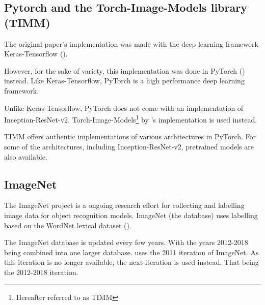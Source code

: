 \documentclass{article}
\begin{document}
    
    \subsection{Pytorch and the Torch-Image-Models library (TIMM)} \label{torch}
        The original paper's implementation was made with the deep learning framework Keras-Tensorflow (\cite{chollet2015keras}).
        
        However, for the sake of variety, this implementation was done in PyTorch (\cite{NEURIPS2019_9015}) instead. Like Keras-Tensorflow, PyTorch is a high performance deep learning framework.
        
        Unlike Keras-Tensorflow, PyTorch does not come with an implementation of Inception-ResNet-v2. Torch-Image-Models\footnote{Hereafter referred to as TIMM} by \cite{rw2019timm}'s implementation is used instead.
        
        TIMM offers authentic implementations of various architectures in PyTorch. For some of the architectures, including Inception-ResNet-v2, pretrained models are also available. 
    
    \subsection{ImageNet} \label{imagenet}
        The ImageNet project is a ongoing research effort for collecting and labelling image data for object recognition models. ImageNet (the database) uses labelling based on the WordNet lexical dataset (\cite{Fellbaum1998}).
        
        The ImageNet database is updated every few years. With the years 2012-2018 being combined into one larger database. \cite{deepkoal2017} uses the 2011 iteration of ImageNet. As this iteration is no longer available, the next iteration is used instead. That being the 2012-2018 iteration.
\end{document}

